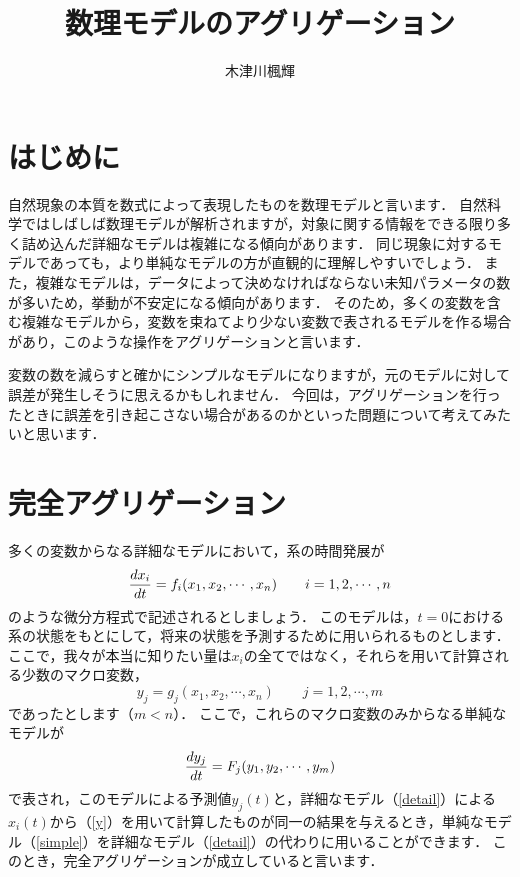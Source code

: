 \documentclass[a5paper]{jsarticle}
\begin{document}
\title{数理モデルのアグリゲーション}
\author{木津川楓輝}
\date{}
\pagestyle{empty}
\maketitle
\section{はじめに}
自然現象の本質を数式によって表現したものを数理モデルと言います．
自然科学ではしばしば数理モデルが解析されますが，対象に関する情報をできる限り多く詰め込んだ詳細なモデルは複雑になる傾向があります．
同じ現象に対するモデルであっても，より単純なモデルの方が直観的に理解しやすいでしょう．
また，複雑なモデルは，データによって決めなければならない未知パラメータの数が多いため，挙動が不安定になる傾向があります．
そのため，多くの変数を含む複雑なモデルから，変数を束ねてより少ない変数で表されるモデルを作る場合があり，このような操作をアグリゲーションと言います．

変数の数を減らすと確かにシンプルなモデルになりますが，元のモデルに対して誤差が発生しそうに思えるかもしれません．
今回は，アグリゲーションを行ったときに誤差を引き起こさない場合があるのかといった問題について考えてみたいと思います．
\section{完全アグリゲーション}
多くの変数からなる詳細なモデルにおいて，系の時間発展が
\begin{equation}
  \dv{x_i}{t} = f_i(x_1, x_2, \cdots, x_n) \qquad i = 1, 2, \cdots, n \label{detail}
\end{equation}
のような微分方程式で記述されるとしましょう．
このモデルは，$t = 0$における系の状態をもとにして，将来の状態を予測するために用いられるものとします．
ここで，我々が本当に知りたい量は$x_i$の全てではなく，それらを用いて計算される少数のマクロ変数，
\begin{equation}
  y_j = g_j(x_1, x_2, \cdots, x_n) \qquad j = 1, 2, \cdots, m \label{y}
\end{equation}
であったとします（$m < n$）．
ここで，これらのマクロ変数のみからなる単純なモデルが
\begin{equation}
  \dv{y_j}{t} = F_j(y_1, y_2, \cdots, y_m) \label{simple}
\end{equation}
で表され，このモデルによる予測値$y_j(t)$と，詳細なモデル（\ref{detail}）による$x_i(t)$から（\ref{y}）を用いて計算したものが同一の結果を与えるとき，単純なモデル（\ref{simple}）を詳細なモデル（\ref{detail}）の代わりに用いることができます．
このとき，完全アグリゲーションが成立していると言います．
\end{document}
